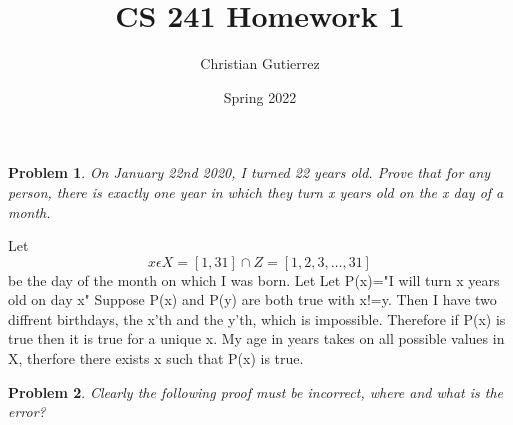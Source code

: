 \documentclass{article}
\title{CS 241 Homework 1}
\author{Christian Gutierrez}
\date{Spring 2022}
\newtheorem{theorem}{Problem}
\begin{document}
\maketitle

\newpage
\begin{theorem}
    On January 22nd 2020, I turned 22 years old. Prove that for
any person, there is exactly one year in which they turn x years old on the x
day of a month.
\end{theorem}

\begin{answer}
    \item Let
  \begin{equation}
    x\epsilon X =[1,31]\cap Z={[1,2,3,\ldots,31]}
  \end{equation}
  be the day of the month on which I was born. Let 
    Let P(x)="I will turn x years old on day x" Suppose P(x) and P(y)
    are both true with x!=y. Then I have two diffrent birthdays, the x'th and the y'th, which is
    impossible. Therefore if P(x) is true then it is true
    for a unique x. My age in years takes on all possible values in X,
    therfore there exists x such that P(x) is true.

\end{answer}

\begin{theorem}
    Clearly the following proof must be incorrect, where and what is
the error?
\end{theorem}
\end{document}
